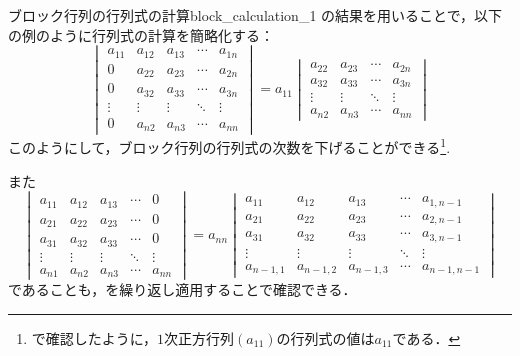 \begin{example}{ブロック行列の行列式の計算}{block_calculation_1}
  の結果を用いることで，以下の例のように行列式の計算を簡略化する：
  \[
  \begin{vmatrix} 
    a_{11} & a_{12} & a_{13} & \cdots & a_{1n} \\
    0      & a_{22} & a_{23} & \cdots & a_{2n} \\
    0      & a_{32} & a_{33} & \cdots & a_{3n} \\
    \vdots & \vdots & \vdots & \ddots & \vdots \\
    0      & a_{n2} & a_{n3} & \cdots & a_{nn}
  \end{vmatrix}
  =
  a_{11}
  \begin{vmatrix} 
    a_{22} & a_{23} & \cdots & a_{2n} \\
    a_{32} & a_{33} & \cdots & a_{3n} \\
    \vdots & \vdots & \ddots & \vdots \\
    a_{n2} & a_{n3} & \cdots & a_{nn}
  \end{vmatrix}
  \]
  このようにして，ブロック行列の行列式の次数を下げることができる\footnote{で確認したように，$1$次正方行列$(a_{11})$の行列式の値は$a_{11}$である．}.

  また
  \[
  \begin{vmatrix} 
    a_{11} &  a_{12} & a_{13} & \cdots &  0 \\
    a_{21} &  a_{22} & a_{23} & \cdots &  0 \\
    a_{31} &  a_{32} & a_{33} & \cdots &  0 \\
    \vdots &  \vdots & \vdots & \ddots &  \vdots \\
    a_{n1} &  a_{n2} & a_{n3} & \cdots &  a_{nn}
  \end{vmatrix}
  =
  a_{nn}
  \begin{vmatrix} 
    a_{11} &  a_{12} & a_{13} & \cdots &  a_{1,n-1} \\
    a_{21} &  a_{22} & a_{23} & \cdots &  a_{2,n-1} \\
    a_{31} &  a_{32} & a_{33} & \cdots &  a_{3,n-1} \\
    \vdots &  \vdots & \vdots & \ddots &  \vdots \\
    a_{n-1,1} &  a_{n-1,2} & a_{n-1,3} & \cdots &  a_{n-1,n-1}
  \end{vmatrix}
  \]
  であることも，を繰り返し適用することで確認できる．
\end{example}


